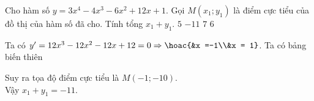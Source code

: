\begin{ex}%
Cho hàm số $ y = 3x^4 - 4x^3 - 6x^2 + 12x + 1. $	Gọi $ M\left(x_1;y_1\right) $ là điểm cực tiểu của đồ thị của hàm số  đã cho. Tính tổng $ x_1 + y_1 $.
	\choice
	{$ 5 $}
	{\True $ -11 $}
	{$ 7 $}
	{$ 6 $}
	\loigiai
	{Ta có $ y' = 12x^3 - 12x^2 - 12x+12 = 0 \Rightarrow \hoac{&x =-1\\&x = 1} $.
		Ta có bảng biến thiên
		\begin{center}
		\end{center}
Suy ra tọa độ điểm cực tiểu là $ M(-1;-10) $.\\ Vậy $ x_1 + y_1 = -11. $		
	}
\end{ex}

